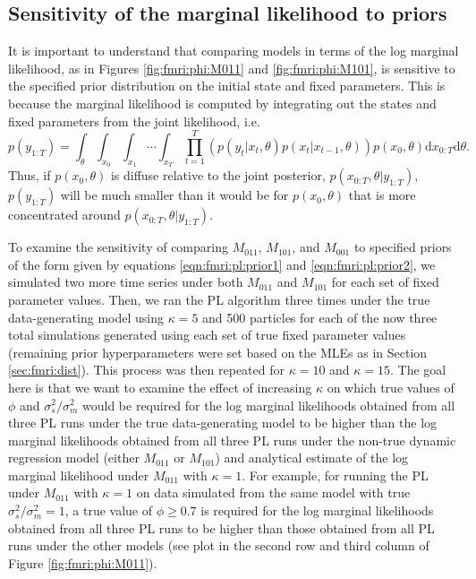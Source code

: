 \subsection{Sensitivity of the marginal likelihood to priors \label{sec:fmri:kappa}}

It is important to understand that comparing models in terms of the log marginal likelihood, as in Figures \ref{fig:fmri:phi:M011} and \ref{fig:fmri:phi:M101}, is sensitive to the specified prior distribution on the initial state and fixed parameters. This is because the marginal likelihood is computed by integrating out the states and fixed parameters from the joint likelihood, i.e.
\begin{equation}
p(y_{1:T}) = \int_{\theta} \int_{x_0} \int_{x_1} \cdots \int_{x_T} \prod_{t=1}^T\left(p(y_t|x_t,\theta)p(x_t|x_{t-1},\theta)\right)p(x_0,\theta)\mbox{d}x_{0:T}\mbox{d}\theta. \label{eqn:int:marg}
\end{equation}
Thus, if $p(x_0,\theta)$ is diffuse relative to the joint posterior, $p(x_{0:T},\theta|y_{1:T})$, $p(y_{1:T})$ will be much smaller than it would be for $p(x_0,\theta)$ that is more concentrated around $p(x_{0:T},\theta|y_{1:T})$.

To examine the sensitivity of comparing $M_{011}$, $M_{101}$, and $M_{001}$ to specified priors of the form given by equations \eqref{eqn:fmri:pl:prior1} and \eqref{eqn:fmri:pl:prior2}, we simulated two more time series under both $M_{011}$ and $M_{101}$ for each set of fixed parameter values. Then, we ran the PL algorithm three times under the true data-generating model using $\kappa = 5$ and 500 particles for each of the now three total simulations generated using each set of true fixed parameter values (remaining prior hyperparameters were set based on the MLEs as in Section \ref{sec:fmri:dist}). This process was then repeated for $\kappa = 10$ and $\kappa = 15$. The goal here is that we want to examine the effect of increasing $\kappa$ on which true values of $\phi$ and $\sigma^2_s / \sigma^2_m$ would be required for the log marginal likelihoods obtained from all three PL runs under the true data-generating model to be higher than the log marginal likelihoods obtained from all three PL runs under the non-true dynamic regression model (either $M_{011}$ or $M_{101}$) and analytical estimate of the log marginal likelihood under $M_{011}$ with $\kappa = 1$. For example, for running the PL under $M_{011}$ with $\kappa = 1$ on data simulated from the same model with true $\sigma^2_s / \sigma^2_m = 1$, a true value of $\phi \ge 0.7$ is required for the log marginal likelihoods obtained from all three PL runs to be higher than those obtained from all PL runs under the other models (see plot in the second row and third column of Figure \ref{fig:fmri:phi:M011}).

